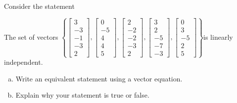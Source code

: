 
\begin{exerciseStatement}


Consider the statement 
\begin{center}\begin{minipage}{0.8\textwidth}
 The set of vectors \( \left\{ \left[\begin{array}{c}
3 \\
-3 \\
-1 \\
-3 \\
2
\end{array}\right] , \left[\begin{array}{c}
0 \\
-5 \\
4 \\
4 \\
5
\end{array}\right] , \left[\begin{array}{c}
2 \\
-2 \\
-2 \\
-3 \\
2
\end{array}\right] , \left[\begin{array}{c}
3 \\
2 \\
-5 \\
-7 \\
-3
\end{array}\right] , \left[\begin{array}{c}
0 \\
3 \\
-5 \\
2 \\
5
\end{array}\right] \right\} \)is linearly independent.
\end{minipage}\end{center}
    


\begin{enumerate}[(a)]
\item  Write an equivalent statement using a vector equation.
\item  Explain why your statement is true or false.
\end{enumerate}
    
\end{exerciseStatement}
    

